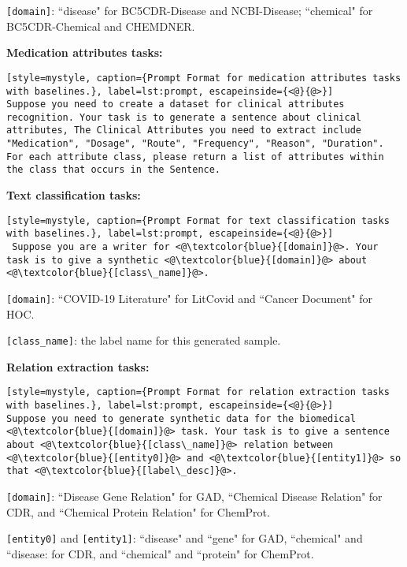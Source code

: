 \documentclass{article} %
\begin{document}
\texttt{[domain]}: ``disease" for BC5CDR-Disease and NCBI-Disease; ``chemical" for BC5CDR-Chemical and CHEMDNER.

\textbf{Medication attributes tasks:}

\begin{lstlisting}[style=mystyle, caption={Prompt Format for medication attributes tasks with baselines.}, label=lst:prompt, escapeinside={<@}{@>}]
Suppose you need to create a dataset for clinical attributes recognition. Your task is to generate a sentence about clinical attributes, The Clinical Attributes you need to extract include "Medication", "Dosage", "Route", "Frequency", "Reason", "Duration". For each attribute class, please return a list of attributes within the class that occurs in the Sentence.
\end{lstlisting}


\textbf{Text classification tasks:}

\begin{lstlisting}[style=mystyle, caption={Prompt Format for text classification tasks with baselines.}, label=lst:prompt, escapeinside={<@}{@>}]
 Suppose you are a writer for <@\textcolor{blue}{[domain]}@>. Your task is to give a synthetic <@\textcolor{blue}{[domain]}@> about <@\textcolor{blue}{[class\_name]}@>. 
\end{lstlisting}
\texttt{[domain]}: ``COVID-19 Literature" for LitCovid and ``Cancer Document" for HOC.

\texttt{[class\_name]}: the label name for this generated sample.

\textbf{Relation extraction tasks:}

\begin{lstlisting}[style=mystyle, caption={Prompt Format for relation extraction tasks with baselines.}, label=lst:prompt, escapeinside={<@}{@>}]
Suppose you need to generate synthetic data for the biomedical <@\textcolor{blue}{[domain]}@> task. Your task is to give a sentence about <@\textcolor{blue}{[class\_name]}@> relation between <@\textcolor{blue}{[entity0]}@> and <@\textcolor{blue}{[entity1]}@> so that <@\textcolor{blue}{[label\_desc]}@>.
\end{lstlisting}
\texttt{[domain]}: ``Disease Gene Relation" for GAD, ``Chemical Disease Relation" for CDR, and ``Chemical Protein Relation" for ChemProt.

\texttt{[entity0]} and \texttt{[entity1]}: ``disease" and ``gene" for GAD, ``chemical" and ``disease: for CDR, and ``chemical" and ``protein" for ChemProt.
\end{document}
